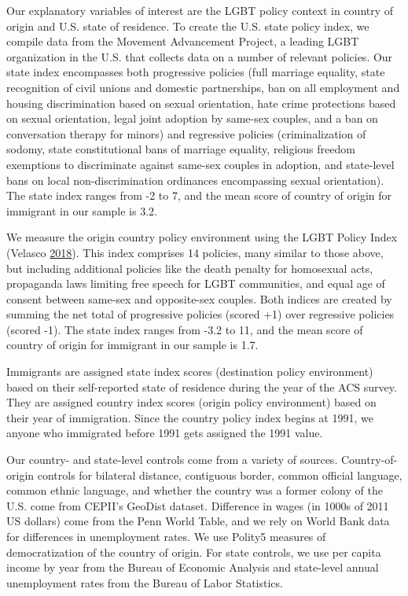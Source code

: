 \documentclass[11pt,]{article}
\begin{document}
Our explanatory variables of interest are the LGBT policy context in country of origin and U.S. state of residence. To create the U.S. state policy index, we compile data from the Movement Advancement Project, a leading LGBT organization in the U.S. that collects data on a number of relevant policies. Our state index encompasses both progressive policies (full marriage equality, state recognition of civil unions and domestic partnerships, ban on all employment and housing discrimination based on sexual orientation, hate crime protections based on sexual orientation, legal joint adoption by same-sex couples, and a ban on conversation therapy for minors) and regressive policies (criminalization of sodomy, state constitutional bans of marriage equality, religious freedom exemptions to discriminate against same-sex couples in adoption, and state-level bans on local non-discrimination ordinances encompassing sexual orientation). The state index ranges from -2 to 7, and the mean score of country of origin for immigrant in our sample is 3.2.

We measure the origin country policy environment using the LGBT Policy Index (Velasco \protect\hyperlink{ref-velasco_2018}{2018}). This index comprises 14 policies, many similar to those above, but including additional policies like the death penalty for homosexual acts, propaganda laws limiting free speech for LGBT communities, and equal age of consent between same-sex and opposite-sex couples. Both indices are created by summing the net total of progressive policies (scored +1) over regressive policies (scored -1). The state index ranges from -3.2 to 11, and the mean score of country of origin for immigrant in our sample is 1.7.

Immigrants are assigned state index scores (destination policy environment) based on their self-reported state of residence during the year of the ACS survey. They are assigned country index scores (origin policy environment) based on their year of immigration. Since the country policy index begins at 1991, we anyone who immigrated before 1991 gets assigned the 1991 value.

Our country- and state-level controls come from a variety of sources. Country-of-origin controls for bilateral distance, contiguous border, common official language, common ethnic language, and whether the country was a former colony of the U.S. come from CEPII's GeoDist dataset. Difference in wages (in 1000s of 2011 US dollars) come from the Penn World Table, and we rely on World Bank data for differences in unemployment rates. We use Polity5 measures of democratization of the country of origin. For state controls, we use per capita income by year from the Bureau of Economic Analysis and state-level annual unemployment rates from the Bureau of Labor Statistics.
\end{document}
